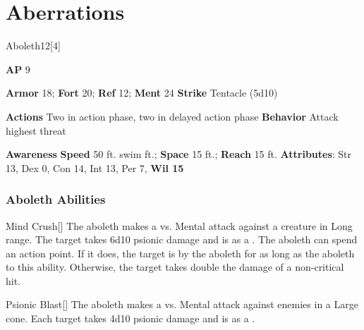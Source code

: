 
\section{Aberrations}

\begin{monsection}{Aboleth}{12}[4]
\vspace{-1em}\vspace{-1em}
\begin{spellcontent}
\begin{spelltargetinginfo}
{\textbf{AP} 9}

\pari \textbf{Armor} 18;
\textbf{Fort} 20;
\textbf{Ref} 12;
\textbf{Ment} 24
\pari \textbf{Strike} Tentacle  (5d10)


\pari \textbf{Actions} Two in action phase, two in delayed action phase
\pari \textbf{Behavior} Attack highest threat
\end{spelltargetinginfo}
\end{spellcontent}

\begin{monsterfooter}
\pari \textbf{Awareness} 
\pari \textbf{Speed} 50 ft. swim ft.;
\textbf{Space} 15 ft.;
\textbf{Reach} 15 ft.
\pari \textbf{Attributes}:
Str 13,
Dex 0,
Con 14,
Int 13,
Per 7,
\textbf{Wil 15}
\end{monsterfooter}
\end{monsection}


\subsubsection{Aboleth Abilities}

\begin{ability}{Mind Crush}[]
The aboleth makes a  vs. Mental attack against a creature in Long range.
\hit The target takes 6d10 psionic damage and is  as a .
\crit The aboleth can spend an action point.
If it does, the target is  by the aboleth for as long as the aboleth  to this ability.
Otherwise, the target takes double the damage of a non-critical hit.
\end{ability}

\vspace{0.5em}
\begin{ability}{Psionic Blast}[]
The aboleth makes a  vs. Mental attack against enemies in a Large cone.
\hit Each target takes 4d10 psionic damage and is  as a .
\end{ability}

